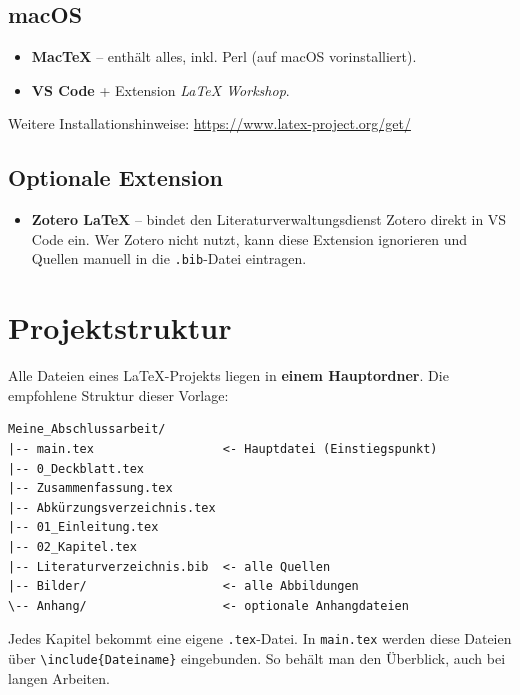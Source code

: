\subsection{macOS}
\begin{itemize}
    \item \textbf{MacTeX} – enthält alles, inkl. Perl (auf macOS vorinstalliert).
    \item \textbf{VS Code} + Extension \textit{LaTeX Workshop}.
\end{itemize}

Weitere Installationshinweise: \url{https://www.latex-project.org/get/}

\subsection{Optionale Extension}
\begin{itemize}
    \item \textbf{Zotero LaTeX} – bindet den Literaturverwaltungsdienst Zotero direkt in VS Code ein.
    Wer Zotero nicht nutzt, kann diese Extension ignorieren und Quellen manuell in die \texttt{.bib}-Datei eintragen.
\end{itemize}

\section{Projektstruktur}
\label{sec:struktur}

Alle Dateien eines LaTeX-Projekts liegen in \textbf{einem Hauptordner}.
Die empfohlene Struktur dieser Vorlage:

\begin{verbatim}
Meine_Abschlussarbeit/
|-- main.tex                  <- Hauptdatei (Einstiegspunkt)
|-- 0_Deckblatt.tex
|-- Zusammenfassung.tex
|-- Abkürzungsverzeichnis.tex
|-- 01_Einleitung.tex
|-- 02_Kapitel.tex
|-- Literaturverzeichnis.bib  <- alle Quellen
|-- Bilder/                   <- alle Abbildungen
\-- Anhang/                   <- optionale Anhangdateien
\end{verbatim}

Jedes Kapitel bekommt eine eigene \texttt{.tex}-Datei.
In \texttt{main.tex} werden diese Dateien über \texttt{\textbackslash include\{Dateiname\}} eingebunden.
So behält man den Überblick, auch bei langen Arbeiten.

